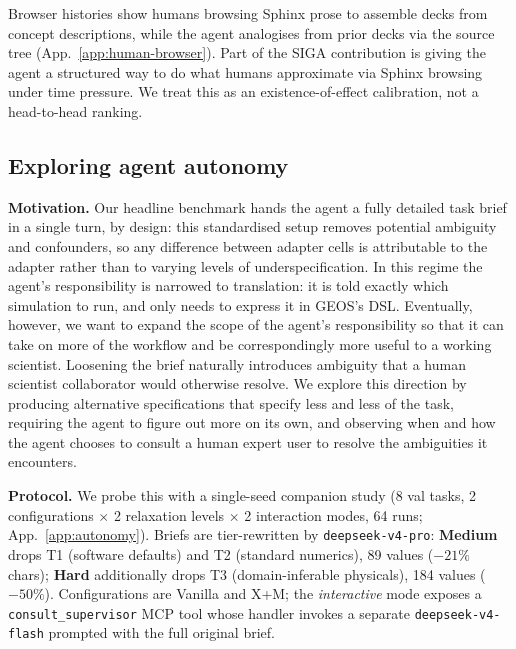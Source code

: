 \documentclass{article}
\begin{document}
Browser histories show humans browsing Sphinx prose to assemble decks from concept descriptions, while the agent analogises from prior decks via the source tree (App.~\ref{app:human-browser}). Part of the SIGA contribution is giving the agent a structured way to do what humans approximate via Sphinx browsing under time pressure. We treat this as an existence-of-effect calibration, not a head-to-head ranking.

\subsection{Exploring agent autonomy}
\label{subsec:autonomy}

\textbf{Motivation.} Our headline benchmark hands the agent a fully detailed task brief in a single turn, by design: this standardised setup removes potential ambiguity and confounders, so any difference between adapter cells is attributable to the adapter rather than to varying levels of underspecification. In this regime the agent's responsibility is narrowed to translation: it is told exactly which simulation to run, and only needs to express it in GEOS's DSL. Eventually, however, we want to expand the scope of the agent's responsibility so that it can take on more of the workflow and be correspondingly more useful to a working scientist. Loosening the brief naturally introduces ambiguity that a human scientist collaborator would otherwise resolve. We explore this direction by producing alternative specifications that specify less and less of the task, requiring the agent to figure out more on its own, and observing when and how the agent chooses to consult a human expert user to resolve the ambiguities it encounters.

\textbf{Protocol.} We probe this with a single-seed companion study (8 val tasks, 2 configurations $\times$ 2 relaxation levels $\times$ 2 interaction modes, 64 runs; App.~\ref{app:autonomy}). Briefs are tier-rewritten by \texttt{deepseek-v4-pro}: \textbf{Medium} drops T1 (software defaults) and T2 (standard numerics), 89 values ($-21\%$ chars); \textbf{Hard} additionally drops T3 (domain-inferable physicals), 184 values ($-50\%$). Configurations are Vanilla and X+M; the \emph{interactive} mode exposes a \texttt{consult\_supervisor} MCP tool whose handler invokes a separate \texttt{deepseek-v4-flash} prompted with the full original brief.
\end{document}
